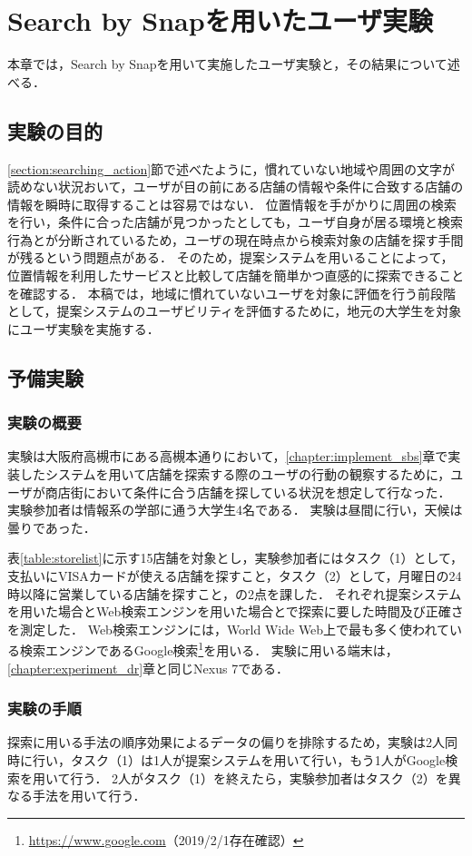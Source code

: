 \chapter{Search by Snapを用いたユーザ実験}
\label{chapter:experiment_sbs}
本章では，Search by Snapを用いて実施したユーザ実験と，その結果について述べる．
\section{実験の目的}
  \ref{section:searching_action}節で述べたように，慣れていない地域や周囲の文字が読めない状況おいて，ユーザが目の前にある店舗の情報や条件に合致する店舗の情報を瞬時に取得することは容易ではない．
  位置情報を手がかりに周囲の検索を行い，条件に合った店舗が見つかったとしても，ユーザ自身が居る環境と検索行為とが分断されているため，ユーザの現在時点から検索対象の店舗を探す手間が残るという問題点がある．
  そのため，提案システムを用いることによって，位置情報を利用したサービスと比較して店舗を簡単かつ直感的に探索できることを確認する．
  本稿では，地域に慣れていないユーザを対象に評価を行う前段階として，提案システムのユーザビリティを評価するために，地元の大学生を対象にユーザ実験を実施する．

\section{予備実験}
  \subsection{実験の概要}
    実験は大阪府高槻市にある高槻本通りにおいて，\ref{chapter:implement_sbs}章で実装したシステムを用いて店舗を探索する際のユーザの行動の観察するために，ユーザが商店街において条件に合う店舗を探している状況を想定して行なった．
    実験参加者は情報系の学部に通う大学生4名である．
    実験は昼間に行い，天候は曇りであった．

    表\ref{table:storelist}に示す15店舗を対象とし，実験参加者にはタスク（1）として，支払いにVISAカードが使える店舗を探すこと，タスク（2）として，月曜日の24時以降に営業している店舗を探すこと，の2点を課した．
    それぞれ提案システムを用いた場合とWeb検索エンジンを用いた場合とで探索に要した時間及び正確さを測定した．
    Web検索エンジンには，World Wide Web上で最も多く使われている検索エンジン\cite{Alexa:2019}であるGoogle検索\footnote{\url{https://www.google.com}（2019/2/1存在確認）}を用いる．
    実験に用いる端末は，\ref{chapter:experiment_dr}章と同じNexus 7である．
    
  \subsection{実験の手順}
    探索に用いる手法の順序効果によるデータの偏りを排除するため，実験は2人同時に行い，タスク（1）は1人が提案システムを用いて行い，もう1人がGoogle検索を用いて行う．
    2人がタスク（1）を終えたら，実験参加者はタスク（2）を異なる手法を用いて行う．

